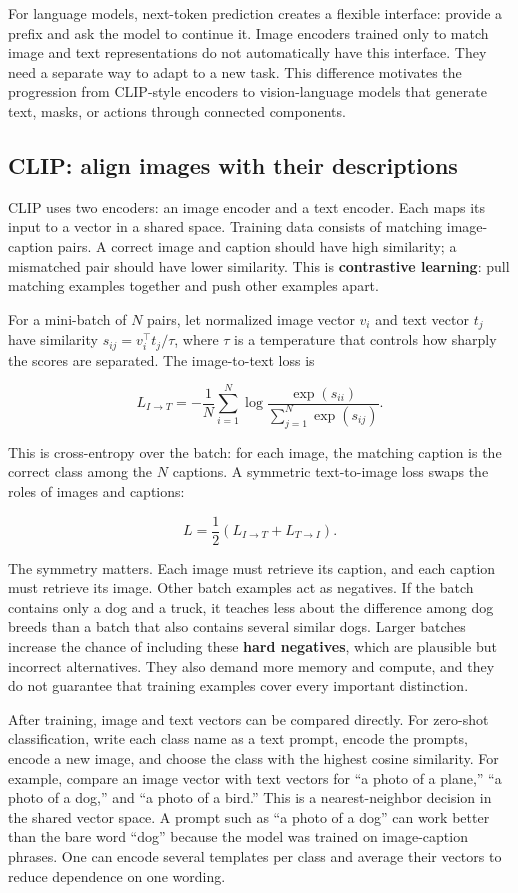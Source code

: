 For language models, next-token prediction creates a flexible interface: provide a prefix and ask the model to continue it. Image encoders trained only to match image and text representations do not automatically have this interface. They need a separate way to adapt to a new task. This difference motivates the progression from CLIP-style encoders to vision-language models that generate text, masks, or actions through connected components.

\subsection{CLIP: align images with their descriptions}\label{04-visual-computing-ii-ch031-clip-align-images-with-their-descriptions}

CLIP uses two encoders: an image encoder and a text encoder. Each maps its input to a vector in a shared space. Training data consists of matching image-caption pairs. A correct image and caption should have high similarity; a mismatched pair should have lower similarity. This is \textbf{contrastive learning}: pull matching examples together and push other examples apart.

For a mini-batch of \(N\) pairs, let normalized image vector \(v_i\) and text vector \(t_j\) have similarity \(s_{ij}=v_i^\top t_j/\tau\), where \(\tau\) is a temperature that controls how sharply the scores are separated. The image-to-text loss is

\[
L_{I\to T}=-\frac{1}{N}\sum_{i=1}^{N}\log\frac{\exp(s_{ii})}{\sum_{j=1}^{N}\exp(s_{ij})}.
\]

This is cross-entropy over the batch: for each image, the matching caption is the correct class among the \(N\) captions. A symmetric text-to-image loss swaps the roles of images and captions:

\[
L=\frac{1}{2}(L_{I\to T}+L_{T\to I}).
\]

The symmetry matters. Each image must retrieve its caption, and each caption must retrieve its image. Other batch examples act as negatives. If the batch contains only a dog and a truck, it teaches less about the difference among dog breeds than a batch that also contains several similar dogs. Larger batches increase the chance of including these \textbf{hard negatives}, which are plausible but incorrect alternatives. They also demand more memory and compute, and they do not guarantee that training examples cover every important distinction.

After training, image and text vectors can be compared directly. For zero-shot classification, write each class name as a text prompt, encode the prompts, encode a new image, and choose the class with the highest cosine similarity. For example, compare an image vector with text vectors for ``a photo of a plane,'' ``a photo of a dog,'' and ``a photo of a bird.'' This is a nearest-neighbor decision in the shared vector space. A prompt such as ``a photo of a dog'' can work better than the bare word ``dog'' because the model was trained on image-caption phrases. One can encode several templates per class and average their vectors to reduce dependence on one wording.

